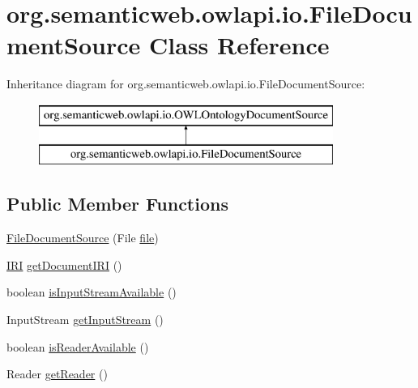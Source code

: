 \hypertarget{classorg_1_1semanticweb_1_1owlapi_1_1io_1_1_file_document_source}{\section{org.\-semanticweb.\-owlapi.\-io.\-File\-Document\-Source Class Reference}
\label{classorg_1_1semanticweb_1_1owlapi_1_1io_1_1_file_document_source}
}
Inheritance diagram for org.\-semanticweb.\-owlapi.\-io.\-File\-Document\-Source\-:\begin{figure}[H]
\begin{center}
\leavevmode
\includegraphics[height=2.000000cm]{classorg_1_1semanticweb_1_1owlapi_1_1io_1_1_file_document_source}
\end{center}
\end{figure}
\subsection*{Public Member Functions}
\begin{DoxyCompactItemize}
\item 
\hyperlink{classorg_1_1semanticweb_1_1owlapi_1_1io_1_1_file_document_source_a978899c3e88cf9c7ec5fe51bda194c15}{File\-Document\-Source} (File \hyperlink{classorg_1_1semanticweb_1_1owlapi_1_1io_1_1_file_document_source_a17df38947bfac25526f71a6f3a6b43a6}{file})
\item 
\hyperlink{classorg_1_1semanticweb_1_1owlapi_1_1model_1_1_i_r_i}{I\-R\-I} \hyperlink{classorg_1_1semanticweb_1_1owlapi_1_1io_1_1_file_document_source_a2d0fb3aa014212c488920cc566d3253f}{get\-Document\-I\-R\-I} ()
\item 
boolean \hyperlink{classorg_1_1semanticweb_1_1owlapi_1_1io_1_1_file_document_source_a17ebd98d0ea9f7a4c887aecaace7b9ec}{is\-Input\-Stream\-Available} ()
\item 
Input\-Stream \hyperlink{classorg_1_1semanticweb_1_1owlapi_1_1io_1_1_file_document_source_a1c37053cb6c2d5b84cd3edc012b8b6d4}{get\-Input\-Stream} ()
\item 
boolean \hyperlink{classorg_1_1semanticweb_1_1owlapi_1_1io_1_1_file_document_source_aa0f297473b883051f7cac68d2778b668}{is\-Reader\-Available} ()
\item 
Reader \hyperlink{classorg_1_1semanticweb_1_1owlapi_1_1io_1_1_file_document_source_a5c3ba3d12aec65c2cab64a2a156ed7cd}{get\-Reader} ()
\end{DoxyCompactItemize}
